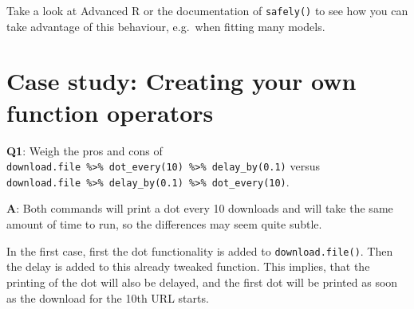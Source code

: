 \documentclass[
]{krantz}
\makeatletter
\newenvironment{Shaded}{\begin{snugshade}}{\end{snugshade}}
\newcommand{\CommentTok}[1]{\textcolor[rgb]{0.56,0.35,0.01}{\textit{#1}}}
\newcommand{\NormalTok}[1]{#1}
\newcommand{\OperatorTok}[1]{\textcolor[rgb]{0.81,0.36,0.00}{\textbf{#1}}}
\newenvironment{kframe}{%
\medskip{}
\setlength{\fboxsep}{.8em}
 \def\at@end@of@kframe{}%
 \ifinner\ifhmode%
  \def\at@end@of@kframe{\end{minipage}}%
  \begin{minipage}{\columnwidth}%
 \fi\fi%
 \def\FrameCommand##1{\hskip\@totalleftmargin \hskip-\fboxsep
 \colorbox{shadecolor}{##1}\hskip-\fboxsep
     \hskip-\linewidth \hskip-\@totalleftmargin \hskip\columnwidth}%
 \MakeFramed {\advance\hsize-\width
   \@totalleftmargin\z@ \linewidth\hsize
   \@setminipage}}%
 {\par\unskip\endMakeFramed%
 \at@end@of@kframe}
\renewenvironment{Shaded}{\begin{kframe}}{\end{kframe}}
\renewcommand{\CommentTok} [1]{\textcolor[rgb]{0.38,0.63,0.69}{{#1}}}
\renewcommand{\NormalTok}  [1]{{#1}}
\makeatother
\begin{document}
\begin{Shaded}
\end{Shaded}

Take a look at Advanced R or the documentation of \texttt{safely()} to see how you can take advantage of this behaviour, e.g.~when fitting many models.

\hypertarget{case-study-creating-your-own-function-operators}{%
\section{Case study: Creating your own function operators}\label{case-study-creating-your-own-function-operators}}

\textbf{{Q1}}: Weigh the pros and cons of \texttt{download.file\ \%\textgreater{}\%\ dot\_every(10)\ \%\textgreater{}\%\ delay\_by(0.1)} versus \texttt{download.file\ \%\textgreater{}\%\ delay\_by(0.1)\ \%\textgreater{}\%\ dot\_every(10)}.

\textbf{{A}}: Both commands will print a dot every 10 downloads and will take the same amount of time to run, so the differences may seem quite subtle.

In the first case, first the dot functionality is added to \texttt{download.file()}. Then the delay is added to this already tweaked function. This implies, that the printing of the dot will also be delayed, and the first dot will be printed as soon as the download for the 10th URL starts.
\end{document}
